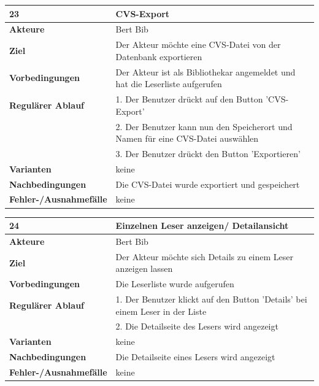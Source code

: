 \documentclass[fontsize=12pt,paper=a4,twoside]{scrartcl}
\begin{document}
\begin{table}[htbp]
\label{23}
\begin{tabular}{|l|p{10cm}|}
\hline 
\textbf{23} & \textbf{CVS-Export} \\ \hline
\textbf{Akteure} & Bert Bib\\ \hline
\textbf{Ziel} & Der Akteur möchte eine CVS-Datei von der Datenbank exportieren \\ \hline
\textbf{Vorbedingungen} & Der Akteur ist als Bibliothekar angemeldet und hat die Leserliste 
aufgerufen \\ \hline
\textbf{Regulärer Ablauf} & 
1. Der Benutzer drückt auf den Button 'CVS-Export' \\
&2. Der Benutzer kann nun den Speicherort und Namen für eine CVS-Datei auswählen\\
&3. Der Benutzer drückt den Button 'Exportieren'\\
\hline
\textbf{Varianten} & 
keine \\ \hline
\textbf{Nachbedingungen} & Die CVS-Datei wurde exportiert und gespeichert\\ \hline
\textbf{Fehler-/Ausnahmefälle} & keine\\
\hline
\end{tabular}
\end{table}

\begin{table}[htbp]
\label{24}
\begin{tabular}{|l|p{10cm}|}
\hline 
\textbf{24} & \textbf{Einzelnen Leser anzeigen/ Detailansicht} \\ \hline
\textbf{Akteure} & Bert Bib\\ \hline
\textbf{Ziel} & Der Akteur möchte sich Details zu einem Leser anzeigen lassen \\ \hline
\textbf{Vorbedingungen} & Die Leserliste wurde aufgerufen \\ \hline
\textbf{Regulärer Ablauf} & 
1. Der Benutzer klickt auf den Button 'Details' bei einem Leser in der Liste \\
&2. Die Detailseite des Lesers wird angezeigt\\
\hline
\textbf{Varianten} & 
keine \\ \hline
\textbf{Nachbedingungen} & Die Detailseite eines Lesers wird angezeigt\\ \hline
\textbf{Fehler-/Ausnahmefälle} & keine\\
\hline
\end{tabular}
\end{table}
\end{document}
